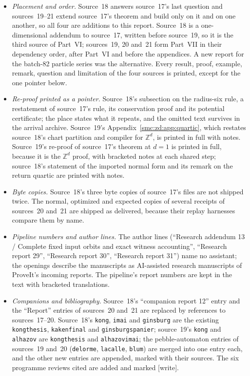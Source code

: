 \documentclass[11pt,letterpaper]{article}
\numberwithin{equation}{section}
\theoremstyle{definition}
\theoremstyle{remark}
\newcommand{\Z}{\mathbb Z}
\newcommand{\wtag}{\textup{[write]}}
\begin{document}
\begin{itemize}
\item \emph{Placement and order.} Source~18 answers source~17's last question and sources~19--21 extend source~17's theorem and build only on it and on one another, so all four are additions to this report. Source~18 is a one-dimensional addendum to source~17, written before source~19, so it is the third source of Part~VI; sources~19, 20 and~21 form Part~VII in their dependency order, after Part~VI and before the appendices. A new report for the batch-82 particle series was the alternative. Every result, proof, example, remark, question and limitation of the four sources is printed, except for the one pointer below.
\item \emph{Re-proof printed as a pointer.} Source~18's subsection on the radius-six rule, a restatement of source~17's rule, its conservation proof and its potential certificate; the place states what it repeats, and the omitted text survives in the arrival archive. Source~19's Appendix~\ref{smc:zd:app:quartic}, which restates source~18's chart partition and compiler for $\Z^d$, is printed in full with notes. Source~19's re-proof of source~17's theorem at $d=1$ is printed in full, because it is the $\Z^d$ proof, with bracketed notes at each shared step; source~18's statement of the imported normal form and its remark on the return quartic are printed with notes.
\item \emph{Byte copies.} Source~18's three byte copies of source~17's files are not shipped twice. The normal, optimized and expected copies of several receipts of sources~20 and~21 are shipped as delivered, because their replay harnesses compare them by name.
\item \emph{Pipeline numbers and author lines.} The author lines (``Research addendum 13 / Complete fixed input orbits and exact witness accounting'', ``Research report 29'', ``Research report 30'', ``Research report 31'') name no assistant; the openings describe the manuscripts as AI-assisted research manuscripts of ProveIt's incoming reports. The pipeline's report numbers are kept in the text with bracketed translations.
\item \emph{Companions and bibliography.} Source~18's ``companion report 12'' entry and the ``Report'' entries of sources~20 and~21 are replaced by references to sources~17--20. Source~18's \texttt{kong}, \texttt{imai} and \texttt{ginsburg} are the existing \texttt{kongthesis}, \texttt{kakenfinal} and \texttt{ginsburgspanier}; source~19's \texttt{kong} and \texttt{alhazov} are \texttt{kongthesis} and \texttt{alhazovimai}; the pebble-automaton entries of sources~19 and~20 (\texttt{delorme}, \texttt{lacalle}, \texttt{blum}) are merged into one entry each, and the other new entries are appended, marked with their sources. The six programme reviews cited are added and marked \wtag.

\end{itemize}
\end{document}
